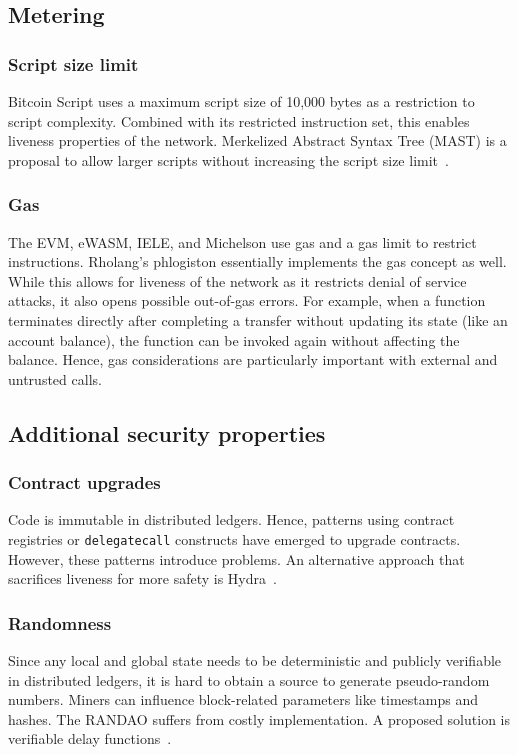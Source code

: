 
\subsection{Metering}

\subsubsection{Script size limit}
Bitcoin Script uses a maximum script size of 10,000 bytes as a restriction to script complexity. Combined with its restricted instruction set, this enables liveness properties of the network. Merkelized Abstract Syntax Tree (MAST) is a proposal to allow larger scripts without increasing the script size limit~\cite{Harding2017}.

\subsubsection{Gas}
The EVM, eWASM, IELE, and Michelson use gas and a gas limit to restrict instructions. Rholang's phlogiston essentially implements the gas concept as well. While this allows for liveness of the network as it restricts denial of service attacks, it also opens possible out-of-gas errors. For example, when a function terminates directly after completing a transfer without updating its state (like an account balance), the function can be invoked again without affecting the balance.
Hence, gas considerations are particularly important with external and untrusted calls.


\subsection{Additional security properties} 
\subsubsection{Contract upgrades}
Code is immutable in distributed ledgers. Hence, patterns using contract registries or \texttt{delegatecall} constructs have emerged to upgrade contracts. However, these patterns introduce problems. An alternative approach that sacrifices liveness for more safety is Hydra~\cite{Breidenbach2018}.

\subsubsection{Randomness}
Since any local and global state needs to be deterministic and publicly verifiable in distributed ledgers, it is hard to obtain a source to generate pseudo-random numbers.
Miners can influence block-related parameters like timestamps and hashes. The RANDAO suffers from costly implementation. A proposed solution is verifiable delay functions~\cite{Boneh2018}.

